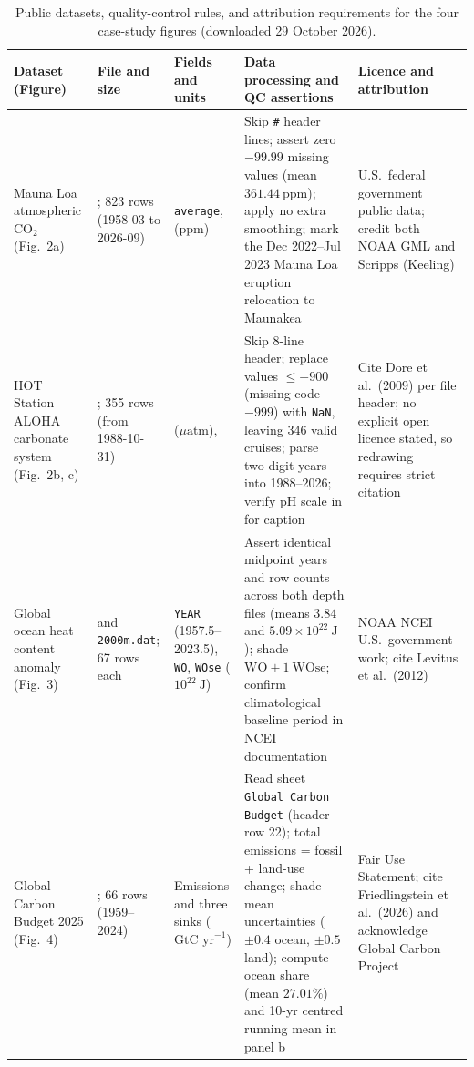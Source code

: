 \begin{table}[htbp]\centering\scriptsize
\setlength{\tabcolsep}{2.5pt}
\renewcommand{\arraystretch}{1.12}
\caption{Public datasets, quality-control rules, and attribution requirements for the four case-study figures (downloaded 29 October 2026).}\label{tab:ch04-sources}
\begin{tabularx}{\linewidth}{@{}>{\raggedright\arraybackslash}p{20mm}>{\raggedright\arraybackslash}p{24mm}>{\raggedright\arraybackslash}p{18mm}Y>{\raggedright\arraybackslash}p{26mm}@{}}
\toprule
\textbf{Dataset (Figure)} & \textbf{File and size} & \textbf{Fields and units} & \textbf{Data processing and QC assertions} & \textbf{Licence and attribution} \\
\midrule
Mauna Loa atmospheric $\text{CO}_2$ (Fig.\ 2a) & ; 823 rows (1958-03 to 2026-09) & \texttt{average},  ($\text{ppm}$) & Skip \texttt{\#} header lines; assert zero $-99.99$ missing values (mean $361.44\ \text{ppm}$); apply no extra smoothing; mark the Dec 2022--Jul 2023 Mauna Loa eruption relocation to Maunakea & U.S.\ federal government public data; credit both NOAA GML and Scripps (Keeling) \\
HOT Station ALOHA carbonate system (Fig.\ 2b, c) & ; 355 rows (from 1988-10-31) &  ($\mu\text{atm}$),  & Skip 8-line header; replace values $\le -900$ (missing code $-999$) with \texttt{NaN}, leaving 346 valid cruises; parse two-digit years into 1988--2026; verify pH scale in  for caption & Cite Dore et al.\ (2009) per file header; no explicit open licence stated, so redrawing requires strict citation \\
Global ocean heat content anomaly (Fig.\ 3) &  and \texttt{2000m.dat}; 67 rows each & \texttt{YEAR} (1957.5--2023.5), \texttt{WO}, \texttt{WOse} ($10^{22}\ \text{J}$) & Assert identical midpoint years and row counts across both depth files (means $3.84$ and $5.09\times 10^{22}\ \text{J}$); shade $\text{WO} \pm 1\ \text{WOse}$; confirm climatological baseline period in NCEI documentation & NOAA NCEI U.S.\ government work; cite Levitus et al.\ (2012) \\
Global Carbon Budget 2025 (Fig.\ 4) & ; 66 rows (1959--2024) & Emissions and three sinks ($\text{GtC yr}^{-1}$) & Read sheet \texttt{Global Carbon Budget} (header row 22); total emissions = fossil + land-use change; shade mean uncertainties ($\pm 0.4$ ocean, $\pm 0.5$ land); compute ocean share (mean $27.01\%$) and 10-yr centred running mean in panel b & Fair Use Statement; cite Friedlingstein et al.\ (2026) and acknowledge Global Carbon Project \\
\bottomrule
\end{tabularx}
\end{table}

